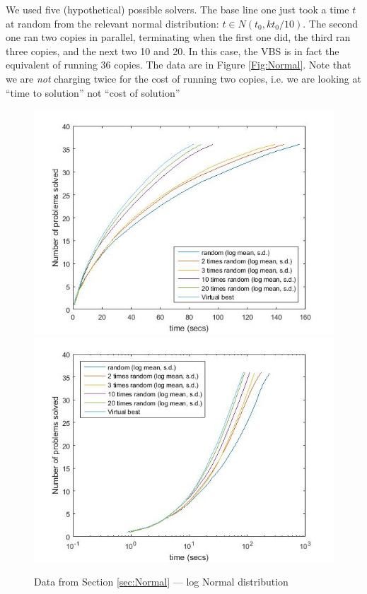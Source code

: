 \documentclass{easychair}
\begin{document}
We used five (hypothetical) possible solvers. The base line one just took a time $t$ at random from the relevant normal distribution: $t \in N(t_0,kt_0/10)$. The second one ran two copies in parallel, terminating when the first one did, the third ran three copies, and the next two 10 and 20. In this case, the VBS is in fact the equivalent of running 36 copies.
The data are in Figure  \ref{Fig:Normal}. Note that we are \emph{not} charging twice for the cost of running two copies, i.e. we are looking at ``time to solution'' not ``cost of solution''
\begin{figure}[h]
\caption{Data from Section \ref{sec:Normal} --- log Normal distribution\label{Fig:Normallog}}
\includegraphics[scale=0.4]{RSolvelog20v2.jpg}
\includegraphics[scale=0.4]{RlogSolvelog20v2.jpg}
\end{figure}
\end{document}

